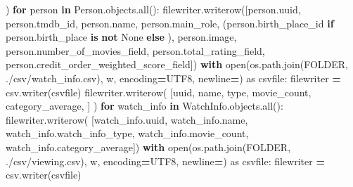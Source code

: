 \documentclass[
]{article}
\newenvironment{Shaded}{\begin{snugshade}}{\end{snugshade}}
\newcommand{\BuiltInTok}[1]{#1}
\newcommand{\ControlFlowTok}[1]{\textcolor[rgb]{0.13,0.29,0.53}{\textbf{#1}}}
\newcommand{\ImportTok}[1]{#1}
\newcommand{\KeywordTok}[1]{\textcolor[rgb]{0.13,0.29,0.53}{\textbf{#1}}}
\newcommand{\NormalTok}[1]{#1}
\newcommand{\OperatorTok}[1]{\textcolor[rgb]{0.81,0.36,0.00}{\textbf{#1}}}
\newcommand{\StringTok}[1]{\textcolor[rgb]{0.31,0.60,0.02}{#1}}
\newcommand{\VariableTok}[1]{\textcolor[rgb]{0.00,0.00,0.00}{#1}}
\begin{document}
\begin{Shaded}
\begin{Highlighting}[]
\NormalTok{            )}
            \ControlFlowTok{for}\NormalTok{ person }\KeywordTok{in}\NormalTok{ Person.objects.}\BuiltInTok{all}\NormalTok{():}
\NormalTok{                filewriter.writerow([person.uuid, person.tmdb\_id, person.name, person.main\_role,}
\NormalTok{                                     (person.birth\_place\_id }\ControlFlowTok{if}\NormalTok{ person.birth\_place }\KeywordTok{is} \KeywordTok{not} \VariableTok{None} \ControlFlowTok{else} \StringTok{\textquotesingle{}\textquotesingle{}}\NormalTok{), person.image,}
\NormalTok{                                     person.number\_of\_movies\_field, person.total\_rating\_field,}
\NormalTok{                                     person.credit\_order\_weighted\_score\_field])}
        \ControlFlowTok{with} \BuiltInTok{open}\NormalTok{(os.path.join(FOLDER, }\StringTok{\textquotesingle{}./csv/watch\_info.csv\textquotesingle{}}\NormalTok{), }\StringTok{\textquotesingle{}w\textquotesingle{}}\NormalTok{,}
\NormalTok{                  encoding}\OperatorTok{=}\StringTok{\textquotesingle{}UTF8\textquotesingle{}}\NormalTok{, newline}\OperatorTok{=}\StringTok{\textquotesingle{}\textquotesingle{}}\NormalTok{) }\ImportTok{as}\NormalTok{ csvfile:}
\NormalTok{            filewriter }\OperatorTok{=}\NormalTok{ csv.writer(csvfile)}
\NormalTok{            filewriter.writerow(}
\NormalTok{                [}\StringTok{\textquotesingle{}uuid\textquotesingle{}}\NormalTok{, }\StringTok{\textquotesingle{}name\textquotesingle{}}\NormalTok{, }\StringTok{\textquotesingle{}type\textquotesingle{}}\NormalTok{, }\StringTok{\textquotesingle{}movie\_count\textquotesingle{}}\NormalTok{, }\StringTok{\textquotesingle{}category\_average\textquotesingle{}}\NormalTok{, ]}
\NormalTok{            )}
            \ControlFlowTok{for}\NormalTok{ watch\_info }\KeywordTok{in}\NormalTok{ WatchInfo.objects.}\BuiltInTok{all}\NormalTok{():}
\NormalTok{                filewriter.writerow(}
\NormalTok{                    [watch\_info.uuid, watch\_info.name, watch\_info.watch\_info\_type, watch\_info.movie\_count,}
\NormalTok{                     watch\_info.category\_average])}
            \ControlFlowTok{with} \BuiltInTok{open}\NormalTok{(os.path.join(FOLDER, }\StringTok{\textquotesingle{}./csv/viewing.csv\textquotesingle{}}\NormalTok{), }\StringTok{\textquotesingle{}w\textquotesingle{}}\NormalTok{,}
\NormalTok{                      encoding}\OperatorTok{=}\StringTok{\textquotesingle{}UTF8\textquotesingle{}}\NormalTok{, newline}\OperatorTok{=}\StringTok{\textquotesingle{}\textquotesingle{}}\NormalTok{) }\ImportTok{as}\NormalTok{ csvfile:}
\NormalTok{                filewriter }\OperatorTok{=}\NormalTok{ csv.writer(csvfile)}

\end{Highlighting}
\end{Shaded}
\end{document}
